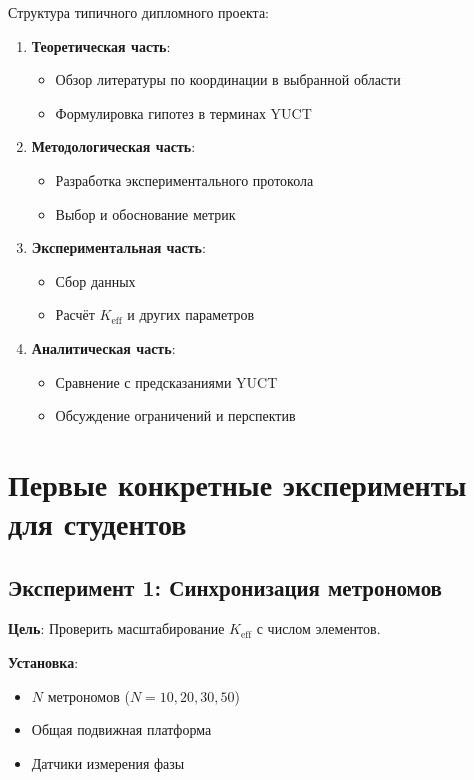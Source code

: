 \documentclass[12pt,a4paper]{article}
\begin{document}
	Структура типичного дипломного проекта:
	\begin{enumerate}
		\item \textbf{Теоретическая часть}:
		\begin{itemize}
			\item Обзор литературы по координации в выбранной области
			\item Формулировка гипотез в терминах YUCT
		\end{itemize}
		
		\item \textbf{Методологическая часть}:
		\begin{itemize}
			\item Разработка экспериментального протокола
			\item Выбор и обоснование метрик
		\end{itemize}
		
		\item \textbf{Экспериментальная часть}:
		\begin{itemize}
			\item Сбор данных
			\item Расчёт $K_{\mathrm{eff}}$ и других параметров
		\end{itemize}
		
		\item \textbf{Аналитическая часть}:
		\begin{itemize}
			\item Сравнение с предсказаниями YUCT
			\item Обсуждение ограничений и перспектив
		\end{itemize}
	\end{enumerate}
	
	\section{Первые конкретные эксперименты для студентов}
	
	\subsection{Эксперимент 1: Синхронизация метрономов}
	
	\textbf{Цель}: Проверить масштабирование $K_{\mathrm{eff}}$ с числом элементов.
	
	\textbf{Установка}:
	\begin{itemize}
		\item $N$ метрономов ($N = 10, 20, 30, 50$)
		\item Общая подвижная платформа
		\item Датчики измерения фазы
	\end{itemize}
	
\end{document}
